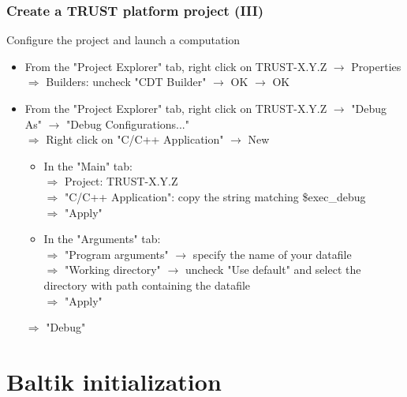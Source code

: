 \documentclass[10pt, hyperref={unicode=true,pdfusetitle, bookmarks=true,bookmarksnumbered=false,bookmarksopen=false, breaklinks=false,pdfborder={0 0 1},backref=true,colorlinks=true,linkcolor=darkblue,pageanchor, urlcolor=darkblue}]{beamer}
\begin{document}
\begin{frame}
\frametitle{Create a TRUST platform project (III)}

\begin{exampleblock}{Configure the project and launch a computation}
\begin{itemize}
\item From the "Project Explorer" tab, right click on TRUST-X.Y.Z $\rightarrow$ Properties \\
  $\Rightarrow$ Builders: uncheck "CDT Builder" $\rightarrow$ OK $\rightarrow$ OK 
\item From the "Project Explorer" tab, right click on TRUST-X.Y.Z $\rightarrow$ "Debug As" $\rightarrow$ "Debug Configurations..."\\
  $\Rightarrow$ Right click on "C/C++ Application" $\rightarrow$ New 
  \begin{itemize}
  \item In the "Main" tab: \\
  $\Rightarrow$ Project: TRUST-X.Y.Z \\
  $\Rightarrow$ "C/C++ Application": copy the string matching \$exec\_debug \\
  $\Rightarrow$ "Apply" \\
  \item In the "Arguments" tab:\\
  $\Rightarrow$ "Program arguments" $\rightarrow$ specify the name of your datafile \\
  $\Rightarrow$ "Working directory" $\rightarrow$ uncheck "Use default" and select the directory with path containing the datafile \\
  $\Rightarrow$ "Apply"
  \end{itemize}
  $\Rightarrow$ "Debug" 
\end{itemize}
\end{exampleblock}

\end{frame}


\section{{\bf{Baltik initialization}}}
\end{document}
